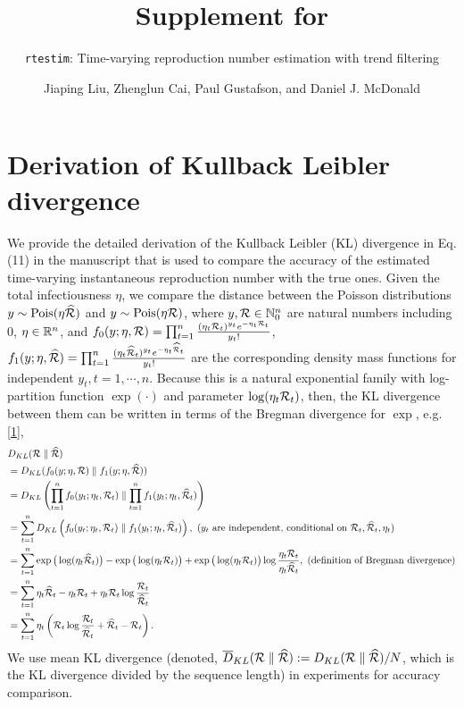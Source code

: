 \documentclass[
]{article}
\title{Supplement for}
\subtitle{\texttt{rtestim}: Time-varying reproduction number estimation with trend filtering}
\author{Jiaping Liu, Zhenglun Cai, Paul Gustafson, and Daniel J. McDonald}
\date{}
\begin{document}
\maketitle

{
\setcounter{tocdepth}{2}
\tableofcontents
}
\hypertarget{derivation-of-kullback-leibler-divergence}{%
\section{Derivation of Kullback Leibler divergence}\label{derivation-of-kullback-leibler-divergence}}

We provide the detailed derivation of the Kullback Leibler (KL) divergence in
Eq. (11) in the manuscript that is used to compare the accuracy of the estimated
time-varying instantaneous reproduction number with the true ones. Given the
total infectiousness \(\eta\), we compare the distance between the Poisson
distributions \(y\sim \textrm{Pois}(\eta \widehat{\mathcal{R}})\) and \(y\sim \textrm{Pois}(\eta \mathcal{R})\),
where \(y,\mathcal{R}\in\mathbb{N}_0^n\) are natural numbers including 0, \(\eta\in\mathbb{R}^n\),
and \(f_0(y;\eta,\mathcal{R}) = \prod_{t=1}^n \frac{(\eta_t\mathcal{R}_t)^{y_t} e^{-\eta_t\mathcal{R}_t}}{y_t!}\),
\(f_1(y;\eta,\widehat{\mathcal{R}}) = \prod_{t=1}^n \frac{(\eta_t\widehat{\mathcal{R}}_t)^{y_t} e^{-\eta_t\widehat{\mathcal{R}}_t}}{y_t!}\) are the corresponding density mass functions
for independent \(y_t,t=1,\cdots,n\). Because this is a natural exponential family
with log-partition function \(\exp(\cdot)\) and parameter \(\log(\eta_t\mathcal{R}_t)\),
then, the KL divergence between them can be written in terms of the Bregman
divergence for \(\exp\), e.g. {[}\protect\hyperlink{ref-WainwrightJordan2008}{1}{]},
\begin{align*}
    &D_{KL}(\mathcal{R} \parallel \widehat{\mathcal{R}})\\ 
    &= D_{KL}(f_0(y;\eta,\mathcal{R}) \parallel f_1(y;\eta,\widehat{\mathcal{R}})) \\
    &= D_{KL}\left(\prod_{t=1}^n f_0(y_t;\eta_t,\mathcal{R}_t) \parallel \prod_{t=1}^n f_1(y_t;\eta_t,\widehat{\mathcal{R}}_t)\right)\\
    &= \sum_{t=1}^n D_{KL}\left(f_0(y_t;\eta_t,\mathcal{R}_t) \parallel f_1(y_t;\eta_t,\widehat{\mathcal{R}}_t)\right),\text{ ($y_t$ are independent, conditional on $\mathcal{R}_t,\widehat{\mathcal{R}}_t,\eta_t$)}\\
    &= \sum_{t=1}^n \exp\big(\log(\eta_t\widehat{\mathcal{R}}_t)\big) - \exp\big(\log(\eta_t\mathcal{R}_t)\big) + \exp\big(\log(\eta_t\mathcal{R}_t)\big)\log\frac{\eta_t\mathcal{R}_t}{\eta_t\widehat{\mathcal{R}}_t}, \text{ (definition of Bregman divergence)} \\
    &= \sum_{t=1}^n \eta_t\widehat{\mathcal{R}}_t - \eta_t\mathcal{R}_t + \eta_t\mathcal{R}_t \log\frac{\mathcal{R}_t}{\widehat{\mathcal{R}}_t}\\
    &= \sum_{t=1}^n \eta_t\left(\mathcal{R}_t \log\frac{\mathcal{R}_t}{\widehat{\mathcal{R}}_t} + \widehat{\mathcal{R}}_t - \mathcal{R}_t\right).\\
\end{align*}
We use mean KL divergence (denoted,
\(\overline{D}_{KL}(\mathcal{R} \parallel \widehat{\mathcal{R}}) := D_{KL}(\mathcal{R} \parallel \widehat{\mathcal{R}}) / N\),
which is the KL divergence divided by the sequence length) in experiments for
accuracy comparison.
\end{document}

